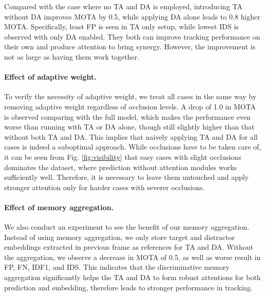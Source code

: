 \documentclass[final]{cvpr}
\begin{document}
Compared with the case where no TA and DA is employed, introducing TA without DA improves MOTA by 0.5, while applying DA alone leads to 0.8 higher MOTA. Specifically, least FP is seen in TA only setup, while lowest IDS is observed with only DA enabled. They both can improve tracking performance on their own and produce attention to bring synergy. However, the improvement is not as large as having them work together.

\paragraph{Effect of adaptive weight.}
To verify the necessity of adaptive weight, we treat all cases in the same way by removing adaptive weight regardless of occlusion levels. A drop of 1.0 in MOTA is observed comparing with the full model, which makes the performance even worse than running with TA or DA alone, though still slightly higher than that without both TA and DA. This implies that naively applying TA and DA for all cases is indeed a suboptimal approach. While occlusions have to be taken care of, it can be seen from Fig. \ref{fig:visibility} that easy cases with slight occlusions dominates the dataset, where prediction without attention modules works sufficiently well. Therefore, it is necessary to leave them untouched and apply stronger attention only for harder cases with severer occlusions.

\paragraph{Effect of memory aggregation.}
We also conduct an experiment to see the benefit of our memory aggregation. Instead of using memory aggregation, we only store target and distractor embeddings extracted in previous frame as references for TA and DA. Without the aggregation, we observe a decrease in MOTA of 0.5, as well as worse result in FP, FN, IDF1, and IDS. This indicates that the discriminative memory aggregation significantly helps the TA and DA to form robust attentions for both prediction and embedding, therefore leads to stronger performance in tracking.

\end{document}
